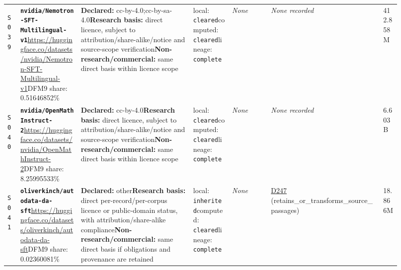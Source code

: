 \documentclass[9pt,a4paper]{article}
\newcommand{\srcid}[1]{\hypertarget{src:#1}{\texttt{#1}}}
\begin{document}
\begin{landscape}
\begin{longtable}{@{}L{0.03\linewidth}L{0.14\linewidth}L{0.26\linewidth}L{0.09\linewidth}L{0.09\linewidth}L{0.265\linewidth}L{0.045\linewidth}@{}}
\srcid{S039} & \textbf{\nolinkurl{nvidia/Nemotron-SFT-Multilingual-v1}}\newline \url{https://huggingface.co/datasets/nvidia/Nemotron-SFT-Multilingual-v1}\newline DFM9 share: 0.51646852\% & \textbf{Declared:} cc-by-4.0;cc-by-sa-4.0\newline \textbf{Research basis:} direct licence, subject to attribution/share-alike/notice and source-scope verification\newline \textbf{Non-research/commercial:} same direct basis within licence scope & local: \texttt{cleared}\newline computed: \texttt{cleared}\newline lineage: \texttt{complete} & \textit{None} & \textit{None recorded} & 412.858M \\
\srcid{S040} & \textbf{\nolinkurl{nvidia/OpenMathInstruct-2}}\newline \url{https://huggingface.co/datasets/nvidia/OpenMathInstruct-2}\newline DFM9 share: 8.25995533\% & \textbf{Declared:} cc-by-4.0\newline \textbf{Research basis:} direct licence, subject to attribution/share-alike/notice and source-scope verification\newline \textbf{Non-research/commercial:} same direct basis within licence scope & local: \texttt{cleared}\newline computed: \texttt{cleared}\newline lineage: \texttt{complete} & \textit{None} & \textit{None recorded} & 6.603B \\
\srcid{S041} & \textbf{\nolinkurl{oliverkinch/autodata-da-sft}}\newline \url{https://huggingface.co/datasets/oliverkinch/autodata-da-sft}\newline DFM9 share: 0.02360081\% & \textbf{Declared:} other\newline \textbf{Research basis:} direct per-record/per-corpus licence or public-domain status, with attribution/share-alike compliance\newline \textbf{Non-research/commercial:} same direct basis if obligations and provenance are retained & local: \texttt{inherited}\newline computed: \texttt{cleared}\newline lineage: \texttt{complete} & \textit{None} & \hyperlink{dep:D247}{D247} (retains\_or\_transforms\_source\_passages) & 18.866M \\

\end{longtable}
\end{landscape}
\end{document}
